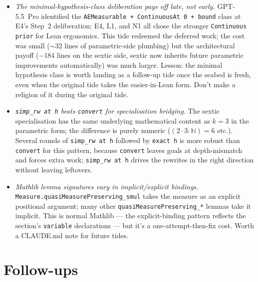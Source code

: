 \documentclass[11pt]{article}
\begin{document}
\begin{itemize}
\item \emph{The minimal-hypothesis-class deliberation pays off late,
  not early.} GPT-5.5~Pro identified the
  \texttt{AEMeasurable + ContinuousAt 0 + bound} class at E4's
  Step~2 deliberation; E4, L1, and N1 all chose the stronger
  \texttt{Continuous prior} for Lean ergonomics. This tide redeemed
  the deferred work; the cost was small ($\sim$32 lines of
  parametric-side plumbing) but the architectural payoff
  ($-184$ lines on the sextic side, sextic now inherits future
  parametric improvements automatically) was much larger.
  Lesson: the minimal hypothesis class is worth landing as a
  follow-up tide once the seabed is fresh, even when the original
  tide takes the easier-in-Lean form. Don't make a religion of it
  during the original tide.
\item \emph{\texttt{simp\_rw at h} beats \texttt{convert} for
  specialisation bridging.} The sextic specialisation has the same
  underlying mathematical content as $k = 3$ in the parametric form;
  the difference is purely numeric ($(2 \cdot 3 : \mathbb N) = 6$ etc.).
  Several rounds of \texttt{simp\_rw at h} followed by
  \texttt{exact h} is more robust than \texttt{convert} for this
  pattern, because \texttt{convert} leaves goals at depth-mismatch
  and forces extra work; \texttt{simp\_rw at h} drives the rewrites
  in the right direction without leaving leftovers.
\item \emph{Mathlib lemma signatures vary in implicit/explicit
  bindings.} \texttt{Measure.quasiMeasurePreserving\_smul} takes the
  measure as an explicit positional argument; many other
  \texttt{quasiMeasurePreserving\_*} lemmas take it implicit.
  This is normal Mathlib --- the explicit-binding pattern reflects
  the section's \texttt{variable} declarations --- but it's a
  one-attempt-then-fix cost. Worth a CLAUDE.md note for future
  tides.
\end{itemize}

\section{Follow-ups}
\end{document}
